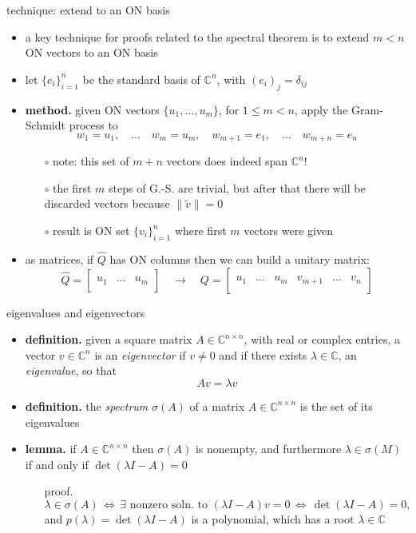 \documentclass[10pt,hyperref]{beamer}
\newcommand{\CC}{\mathbb{C}}
\newcommand{\trefmatrixtwo}[2]{\left[\begin{array}{c|c|c} & & \\ #1 & \dots & #2 \\ & & \end{array}\right]}
\newcommand{\trefmatrixgroups}[4]{\left[\begin{array}{c|c|c|c|c|c} & & & & & \\ #1 & \dots & #2 & #3 & \dots & #4 \\ & & & & & \end{array}\right]}
\begin{document}
\begin{frame}{technique: extend to an ON basis}

\begin{itemize}
\item a key technique for proofs related to the spectral theorem is to extend $m<n$ ON vectors to an ON basis
\item let $\{e_i\}_{i=1}^n$ be the standard basis of $\CC^n$, with $(e_i)_j = \delta_{ij}$
\item \textbf{method.} given ON vectors $\{u_1,\dots,u_m\}$, for $1 \le m<n$, apply the Gram-Schmidt process to
    $$w_1=u_1, \quad \dots \quad w_m=u_m, \quad w_{m+1}=e_1, \quad \dots \quad w_{m+n}=e_n$$

\vspace{-2mm}
    \begin{itemize}
    \item[$\circ$] note: this set of $m+n$ vectors does indeed span $\CC^n$!
    \item[$\circ$] the first $m$ steps of G.-S. are trivial, but after that there will be discarded vectors because $\|\tilde v\|=0$
    \item[$\circ$] result is ON set $\{v_i\}_{i=1}^n$ where first $m$ vectors were given
    \end{itemize}
\item as matrices, if $\hat Q$ has ON columns then we can build a unitary matrix:
\small
    $$\hat Q = \trefmatrixtwo{u_1}{u_m} \quad \to \quad Q = \trefmatrixgroups{u_1}{u_m}{v_{m+1}}{v_n}$$
\end{itemize}
\end{frame}


\begin{frame}{eigenvalues and eigenvectors}

\begin{itemize}
\item \textbf{definition.}  given a square matrix $A \in \CC^{n\times n}$, with real or complex entries, a vector $v\in\CC^n$ is an \emph{eigenvector} if $v\ne 0$ and if there exists $\lambda\in \CC$, an \emph{eigenvalue}, so that
    $$A v = \lambda v$$
\item \textbf{definition.}  the \emph{spectrum} $\sigma(A)$ of a matrix $A \in \CC^{n\times n}$ is the set of its eigenvalues
\item \textbf{lemma.} if $A \in \CC^{n\times n}$ then $\sigma(A)$ is nonempty, and furthermore $\lambda\in\sigma(M)$ if and only if $\det(\lambda I - A)=0$
    \begin{itemize}
    \item[proof.] 
   $$\lambda\in\sigma(A) \, \iff \, \exists \text{ nonzero soln.~to } (\lambda I - A) v = 0 \, \iff \, \det(\lambda I - A)=0,$$
and $p(\lambda) = \det(\lambda I - A)$ is a polynomial, which has a root $\lambda\in\CC$
    \end{itemize}
\end{itemize}
\end{frame}
\end{document}
